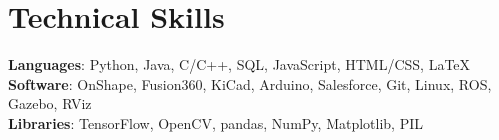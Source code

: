 \documentclass[letterpaper,11pt]{article}
\begin{document}
\section{Technical Skills}
 \begin{itemize}[leftmargin=0.15in, label={}]
    \small{\item{
     \textbf{Languages}{: Python, Java, C/C++, SQL, JavaScript, HTML/CSS, LaTeX} \\
     \textbf{Software}{: OnShape, Fusion360, KiCad, Arduino, Salesforce, Git, Linux, ROS, Gazebo, RViz} \\ 
     \textbf{Libraries}{: TensorFlow, OpenCV, pandas, NumPy, Matplotlib, PIL}
    }}
 \end{itemize}


\end{document}

